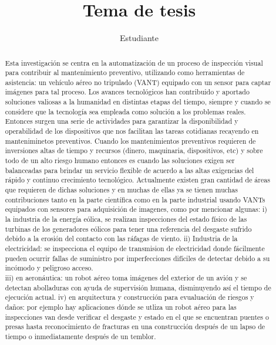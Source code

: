 \documentclass[]{report}
\title{Tema de tesis}
\author{Estudiante}
\begin{document}
	

	

\newpage\null\thispagestyle{empty}\newpage
	

\begin{abstract}
Esta investigación se centra en la automatización de un proceso de inspección visual para contribuir al mantenimiento preventivo, utilizando como herramientas de asistencia: un vehículo aéreo no tripulado (VANT) equipado con un sensor para captar imágenes para tal proceso.
Los avances tecnológicos han contribuido y aportado soluciones valiosas a la humanidad en distintas etapas del tiempo, siempre y cuando  se considere que la tecnología sea empleada como solución a los problemas reales. Entonces surgen una serie de actividades para garantizar la disponibilidad y operabilidad de los dispositivos que nos facilitan las tareas cotidianas recayendo en manteniminetos preventivos. Cuando los mantenimientos preventivos requieren de inversiones altas de tiempo y recursos (dinero, maquinaria, dispositivos, etc) y sobre todo de un alto riesgo humano entonces es cuando las soluciones exigen ser balanceadas para brindar un servicio flexible de acuerdo a las altas exigencias del rápido y continuo crecimiento tecnológico.
Actualmente existen gran cantidad de áreas que requieren de dichas soluciones y en muchas de ellas ya se tienen muchas contribuciones tanto en la parte científica como en la parte industrial usando VANTs equipados con sensores para adquisición de imagenes, como por mencionar algunas: 
i) la industria de la energía eólica, se realizan inspecciones del estado físico de las turbinas de los generadores eólicos para tener una referencia del desgaste sufrido debido a la erosión del contacto con las ráfagas de viento.
ii) Industria de la electricidad: se inspecciona el equipo de transmision de electricidad donde fácilmente pueden ocurrir fallas de suministro por imperfecciones difíciles de detectar debido a su incómodo y peligroso acceso.\\
iii) en aeronáutica: un robot aéreo toma imágenes del exterior de un avión y se detectan abolladuras con ayuda de supervisión humana, disminuyendo así el tiempo de ejecución actual.
iv) en arquitectura y construcción para evualuación de riesgos y daños: por ejemplo hay aplicaciones dónde se utliza un robot aéreo para  las inspecciones van desde verificar el desgaste y estado en el que se encuentran puentes o presas hasta reconocimiento de fracturas en una construcción después de un lapso de tiempo o inmediatamente después de un temblor.
\end{abstract}
\end{document}
